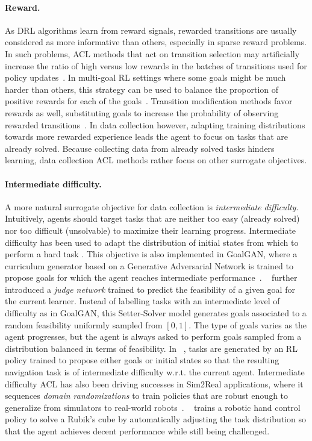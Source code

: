 \documentclass{article}
\newcommand{\mycite}[1]{\citeauthor{#1}~\shortcite{#1}}
\begin{document}
\paragraph{Reward.}As DRL algorithms learn from reward signals, rewarded transitions are usually considered as more informative than others, especially in sparse reward problems.
%
In such problems, ACL methods that act on transition selection may artificially increase the ratio of high versus low rewards in the batches of transitions used for policy updates~\cite{narasimhan2015language,unreal,imagine}.
% 
In multi-goal RL settings where some goals might be much harder than others, this strategy can be used to balance the proportion of positive rewards for each of the goals~\cite{curious,le2}.
%
Transition modification methods favor rewards as well, substituting goals to increase the probability of observing rewarded transitions~\cite{her,cideron2019self,le2,imagine}.
%
In data collection however, adapting training distributions towards more rewarded experience leads the agent to focus on tasks that are already solved. Because collecting data from already solved tasks hinders learning, data collection ACL methods rather focus on other surrogate objectives.

\paragraph{Intermediate difficulty.} A more natural surrogate objective for data collection is \textit{intermediate difficulty}. Intuitively, agents should target tasks that are neither too easy (already solved) nor too difficult (unsolvable) to maximize their learning progress. Intermediate difficulty has been used to adapt the distribution of initial states from which to perform a hard task \cite{reverse-cur,montezuma-single-demo,BaRC}. This objective is also implemented in {GoalGAN}, where a curriculum generator based on a Generative Adversarial Network is trained to propose goals for which the agent reaches intermediate performance~\cite{goalgan}.
\mycite{settersolver} further introduced a \textit{judge network} trained to predict the feasibility of a given goal for the current learner. Instead of labelling tasks with an intermediate level of difficulty as in GoalGAN, this Setter-Solver model generates goals associated to a random feasibility uniformly sampled from $[0,1]$. The type of goals varies as the agent progresses, but the agent is always asked to perform goals sampled from a distribution balanced in terms of feasibility. 
%
In \mycite{asymetricSP}, tasks are generated by an RL policy trained to propose either goals or initial states so that the resulting navigation task is of intermediate difficulty w.r.t. the current agent. 
%
Intermediate difficulty ACL has also been driving successes in Sim2Real applications, where it sequences \textit{domain randomizations} to train policies that are robust enough to generalize from simulators to real-world robots~\cite{ADRmila,OpenAI2019SolvingRC}. \mycite{OpenAI2019SolvingRC} trains a robotic hand control policy to solve a Rubik's cube by automatically adjusting the task distribution so that the agent achieves decent performance while still being challenged.
\end{document}
